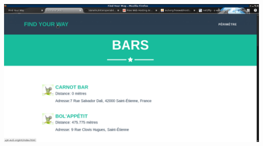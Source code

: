 \documentclass[10pt,a4paper, landscape]{report}
\begin{document}
\newpage
\includegraphics[scale=0.5]{images/carnot_ajouter.png} 
\end{document}
